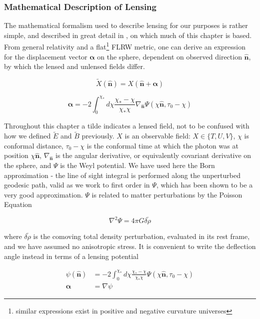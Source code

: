 \documentclass[a4paper,10pt]{article}
\renewcommand{\v}[1]{\mathbf{#1}}
\newcommand{\unit}[1]{\hat{\v{#1}}}
\begin{document}
\subsubsection{Mathematical Description of Lensing}

The mathematical formalism used to describe lensing for our purposes is rather simple, and described in great detail in \cite{lewis}, on which much of this chapter is based. From general relativity and a flat\footnote{similar expressions exist in positive and negative curvature universes} FLRW metric, one can derive an expression for the displacement vector $\v{\alpha}$ on the sphere, dependent on observed direction $\unit{n}$, by which the lensed and unlensed fields differ. 

\begin{equation}
\tilde{X}(\unit{n}) = X(\unit{n}+\v{\alpha})
\end{equation}

\begin{equation}
\v{\alpha} = -2 \int_0^{\chi_*}d\chi \frac{\chi_*-\chi}{\chi_*\chi}\nabla_{\unit{n}}\Psi(\chi\unit{n},\tau_0-\chi)
\end{equation}

Throughout this chapter a tilde indicates a lensed field, not to be confused with how we defined $\tilde{E}$ and $\tilde{B}$ previously. $X$ is an observable field: $X \in \{ T, U, V\}$, $\chi$ is conformal distance, $\tau_0-\chi$ is the conformal time at which the photon was at position $\chi\unit{n}$, $\nabla_{\unit{n}}$ is the angular derivative, or equivalently covariant derivative on the sphere, and $\Psi$ is the Weyl potential. We have used here the Born approximation - the line of sight integral is performed along the unperturbed geodesic path, valid as we work to first order in $\Psi$, which has been shown to be a very good approximation. $\Psi$ is related to matter perturbations by the Poisson Equation

\begin{equation}
\nabla^2\Psi = 4\pi G\bar{\delta\rho}
\label{poisson}
\end{equation}

where $\bar{\delta\rho}$ is the comoving total density perturbation, evaluated in its rest frame, and we have assumed no anisotropic stress. It is convenient to write the deflection angle instead in terms of a lensing potential

\begin{equation}\begin{split}
\psi(\unit{n}) &= -2 \int_0^{\chi_*}d\chi \frac{\chi_*-\chi}{\chi_*\chi}\Psi(\chi\unit{n},\tau_0-\chi)\\
\v{\alpha} &= \nabla \psi
\end{split}\end{equation}
\end{document}
